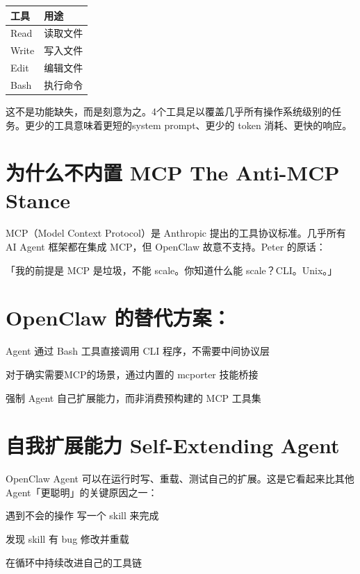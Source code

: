\documentclass[
  10
]{article}
\newcounter{none} %
\begin{document}
{\def\LTcaptype{none} %
\begin{longtable}[]{@{}|l|l|@{}}
\toprule\noalign{}
\endhead
\bottomrule\noalign{}
\endlastfoot
\hline
工具 & 用途 \\
\hline
Read & 读取文件 \\
\hline
Write & 写入文件 \\
\hline
Edit & 编辑文件 \\
\hline
Bash & 执行命令 \\
\hline
\end{longtable}
}

这不是功能缺失，而是刻意为之。4个工具足以覆盖几乎所有操作系统级别的任务。更少的工具意味着更短的system
prompt、更少的 token 消耗、更快的响应。

\section{为什么不内置 MCP The Anti-MCP
Stance}\label{ux4e3aux4ec0ux4e48ux4e0dux5185ux7f6e-mcp-the-anti-mcp-stance}

MCP（Model Context Protocol）是 Anthropic 提出的工具协议标准。几乎所有
AI Agent 框架都在集成 MCP，但 OpenClaw 故意不支持。Peter 的原话：

「我的前提是 MCP 是垃圾，不能 scale。你知道什么能 scale？CLI。Unix。」

\section{OpenClaw
的替代方案：}\label{openclaw-ux7684ux66ffux4ee3ux65b9ux6848}

Agent 通过 Bash 工具直接调用 CLI 程序，不需要中间协议层

对于确实需要MCP的场景，通过内置的 mcporter 技能桥接

强制 Agent 自己扩展能力，而非消费预构建的 MCP 工具集

\section{自我扩展能力 Self-Extending
Agent}\label{ux81eaux6211ux6269ux5c55ux80fdux529b-self-extending-agent}

OpenClaw Agent 可以在运行时写、重载、测试自己的扩展。这是它看起来比其他
Agent「更聪明」的关键原因之一：

遇到不会的操作 写一个 skill 来完成

发现 skill 有 bug 修改并重载

在循环中持续改进自己的工具链
\end{document}
